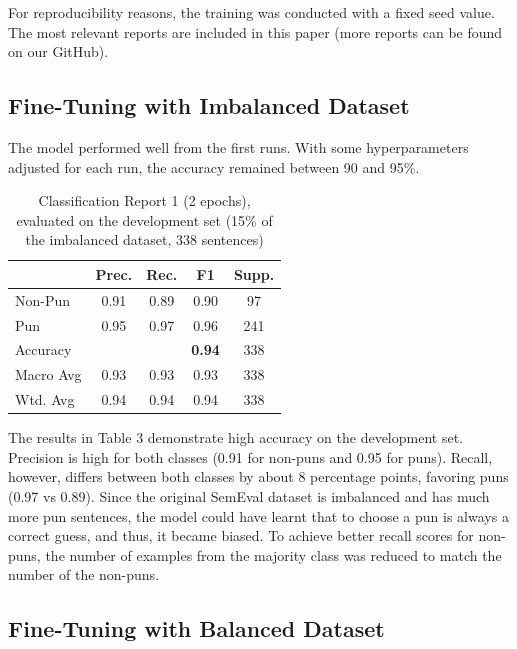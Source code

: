 \documentclass[11pt,a4paper]{article}
\begin{document}
For reproducibility reasons, the training was conducted with a fixed seed value. The most relevant reports are included in this paper (more reports can be found on our GitHub).


\subsection{Fine-Tuning with Imbalanced Dataset}

The model performed well from the first runs. With some hyperparameters adjusted for each run, the accuracy remained between 90 and 95\%.

\begin{table}[h]
\centering
\small %
\setlength{\tabcolsep}{4pt} %
\begin{tabular}{l|cccc}
\hline
& \textbf{Prec.} & \textbf{Rec.} & \textbf{F1} & \textbf{Supp.} \\ 
\hline
Non-Pun      & 0.91 & 0.89 & 0.90 & 97  \\
Pun          & 0.95 & 0.97 & 0.96 & 241 \\
\hline
Accuracy     &      &      & \textbf{0.94} & 338 \\
Macro Avg    & 0.93 & 0.93 & 0.93 & 338 \\
Wtd. Avg     & 0.94 & 0.94 & 0.94 & 338 \\
\hline
\end{tabular}
\caption{Classification Report 1 (2 epochs), evaluated on the development set (15\% of the imbalanced dataset, 338 sentences)}
\label{tab:classification_report}
\end{table}

The results in Table 3 demonstrate high accuracy on the development set. Precision is high for both classes (0.91 for non-puns and 0.95 for puns). Recall, however, differs between both classes by about 8 percentage points, favoring puns (0.97 vs 0.89). Since the original SemEval dataset is imbalanced and has much more pun sentences, the model could have learnt that to choose a pun is always a correct guess, and thus, it became biased.
To achieve better recall scores for non-puns, the number of examples from the majority class was reduced to match the number of the non-puns. 


\subsection{Fine-Tuning with Balanced Dataset}
\end{document}
